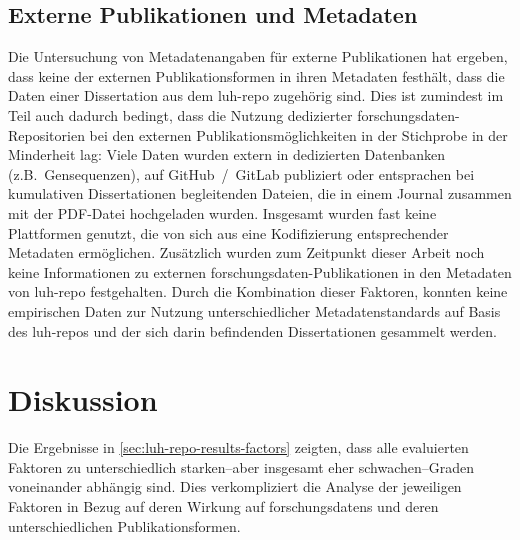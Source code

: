 \subsection{Externe Publikationen und Metadaten}\label{sec:luh-repo-results-external-metadata}
Die Untersuchung von Metadatenangaben für externe Publikationen hat ergeben, dass keine der externen Publikationsformen in ihren Metadaten festhält, dass die Daten einer Dissertation aus dem \gls{luh-repo} zugehörig sind.
Dies ist zumindest im Teil auch dadurch bedingt, dass die Nutzung dedizierter \gls{forschungsdaten}-Repositorien bei den externen Publikationsmöglichkeiten in der Stichprobe in der Minderheit lag:
Viele Daten wurden extern in dedizierten Datenbanken (z.B.~Gensequenzen), auf GitHub~/~GitLab publiziert oder entsprachen bei kumulativen Dissertationen begleitenden Dateien, die in einem Journal zusammen mit der PDF-Datei hochgeladen wurden.
Insgesamt wurden fast keine Plattformen genutzt, die von sich aus eine Kodifizierung entsprechender Metadaten ermöglichen.
Zusätzlich wurden zum Zeitpunkt dieser Arbeit noch keine Informationen zu externen \gls{forschungsdaten}-Publikationen in den Metadaten von \gls{luh-repo} festgehalten.
Durch die Kombination dieser Faktoren, konnten keine empirischen Daten zur Nutzung unterschiedlicher Metadatenstandards auf Basis des \gls{luh-repo}s und der sich darin befindenden Dissertationen gesammelt werden.

\section{Diskussion}\label{sec:luh-repo-discussion}
Die Ergebnisse in \cref{sec:luh-repo-results-factors} zeigten, dass alle evaluierten Faktoren zu unterschiedlich starken--aber insgesamt eher schwachen--Graden voneinander abhängig sind.
Dies verkompliziert die Analyse der jeweiligen Faktoren in Bezug auf deren Wirkung auf \glspl{forschungsdaten} und deren unterschiedlichen Publikationsformen.

